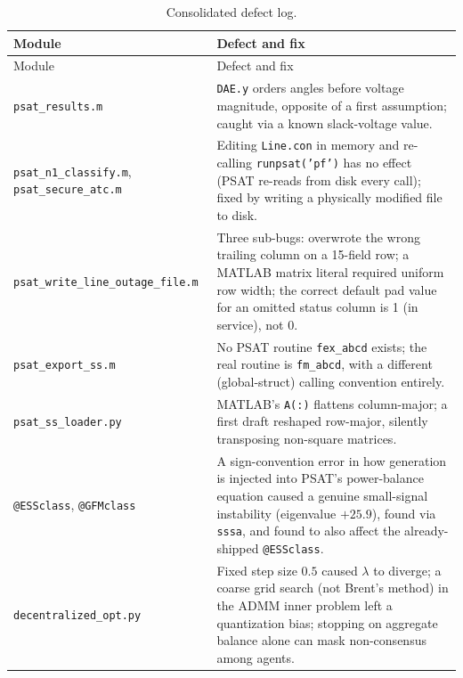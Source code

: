 \documentclass[11pt]{report}
\newcommand{\pkg}[1]{\texttt{#1}}
\theoremstyle{plain}
\theoremstyle{definition}
\theoremstyle{remark}
\begin{document}
\begin{longtable}{@{}p{3.6cm}p{11.9cm}@{}}
\caption{Consolidated defect log.}
\label{tab:bugs}\\
\toprule
Module & Defect and fix \\
\midrule
\endfirsthead
\toprule
Module & Defect and fix \\
\midrule
\endhead
\pkg{psat\_\hspace{0pt}results.m} & \texttt{DAE.y} orders angles before voltage magnitude, opposite of a first assumption; caught via a known slack-voltage value. \\
\pkg{psat\_\hspace{0pt}n1\_\hspace{0pt}classify.m}, \pkg{psat\_\hspace{0pt}secure\_\hspace{0pt}atc.m} & Editing \texttt{Line.con} in memory and re-calling \texttt{runpsat('pf')} has no effect (PSAT re-reads from disk every call); fixed by writing a physically modified file to disk. \\
\pkg{psat\_\hspace{0pt}write\_\hspace{0pt}line\_\hspace{0pt}outage\_\hspace{0pt}file.m} & Three sub-bugs: overwrote the wrong trailing column on a 15-field row; a MATLAB matrix literal required uniform row width; the correct default pad value for an omitted status column is 1 (in service), not 0. \\
\pkg{psat\_\hspace{0pt}export\_\hspace{0pt}ss.m} & No PSAT routine \texttt{fex\_abcd} exists; the real routine is \texttt{fm\_abcd}, with a different (global-struct) calling convention entirely. \\
\pkg{psat\_\hspace{0pt}ss\_\hspace{0pt}loader.py} & MATLAB's \texttt{A(:)} flattens column-major; a first draft reshaped row-major, silently transposing non-square matrices. \\
\pkg{@ESSclass}, \pkg{@GFMclass} & A sign-convention error in how generation is injected into PSAT's power-balance equation caused a genuine small-signal instability (eigenvalue $+25.9$), found via \texttt{sssa}, and found to also affect the already-shipped \pkg{@ESSclass}. \\
\pkg{decentralized\_\hspace{0pt}opt.py} & Fixed step size $0.5$ caused $\lambda$ to diverge; a coarse grid search (not Brent's method) in the ADMM inner problem left a quantization bias; stopping on aggregate balance alone can mask non-consensus among agents. \\

\end{longtable}
\end{document}

